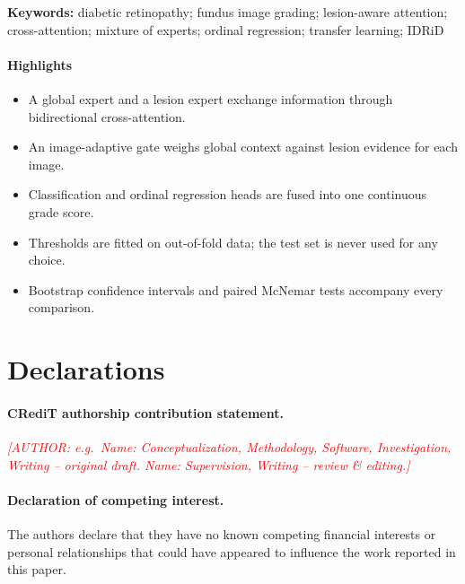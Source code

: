 \documentclass[11pt,a4paper]{article}
\newif\ifsectionsonnewpages\sectionsonnewpagestrue
\newcommand{\sectionbreak}{\ifsectionsonnewpages\clearpage\fi}
\newcommand{\authnote}[1]{\textcolor{red}{\textit{[AUTHOR: #1]}}}
\begin{document}
\noindent\textbf{Keywords:} diabetic retinopathy; fundus image grading; lesion-aware attention; cross-attention;
mixture of experts; ordinal regression; transfer learning; IDRiD

\paragraph{Highlights}\label{start:front}
\begin{itemize}
\item A global expert and a lesion expert exchange information through bidirectional cross-attention.
\item An image-adaptive gate weighs global context against lesion evidence for each image.
\item Classification and ordinal regression heads are fused into one continuous grade score.
\item Thresholds are fitted on out-of-fold data; the test set is never used for any choice.
\item Bootstrap confidence intervals and paired McNemar tests accompany every comparison.
\end{itemize}

\clearpage

\sectionbreak
\sectionbreak
\sectionbreak
\sectionbreak
\sectionbreak
\sectionbreak
\sectionbreak

\clearpage
\section*{Declarations}\label{start:decl}
\paragraph{CRediT authorship contribution statement.}
\authnote{e.g.\ Name: Conceptualization, Methodology, Software, Investigation, Writing -- original draft.
Name: Supervision, Writing -- review \& editing.}

\paragraph{Declaration of competing interest.}
The authors declare that they have no known competing financial interests or personal relationships that could have
appeared to influence the work reported in this paper.
\end{document}
